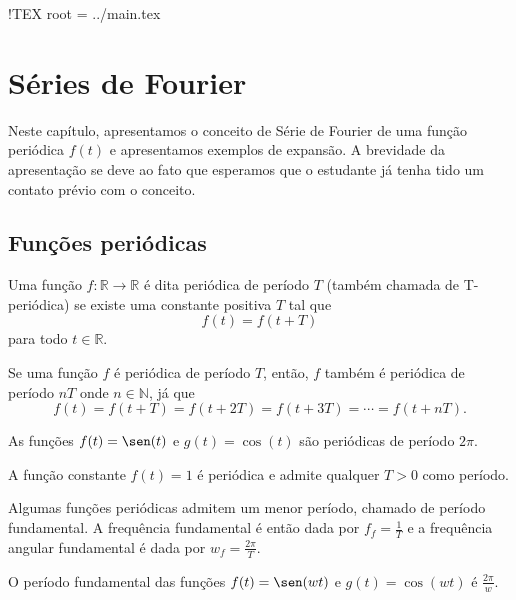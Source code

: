 !TEX root = ../main.tex
\chapter{Séries de Fourier} %
Neste capítulo, apresentamos o conceito de Série de Fourier de uma função periódica $f(t)$ e apresentamos exemplos de expansão. A brevidade da apresentação se deve ao fato que esperamos que o estudante já tenha tido um contato prévio com o conceito.
\section{Funções periódicas}
\begin{defn} Uma função $f:\mathbb{R}\to\mathbb{R}$ é dita periódica de período $T$ (também chamada de T-periódica) se existe uma constante positiva $T$ tal que
\begin{equation}f(t)=f(t+T)\end{equation}
para todo $t\in\mathbb{R}.$
\end{defn}
\begin{obs} Se uma função $f$ é periódica de período $T$, então, $f$ também é periódica de período $nT$ onde $n\in\mathbb{N}$, já que
\begin{equation}f(t)=f(t+T)=f(t+2T)=f(t+3T)=\cdots =f(t+nT).\end{equation}
 \end{obs}
 \begin{ex}
  As funções $f(t)=\sen(t)$ e $g(t)=\cos(t)$ são periódicas de período $2\pi$.
 \end{ex}
\begin{ex}
  A função constante $f(t)=1$ é periódica e admite qualquer $T>0$ como período.
 \end{ex}
\begin{defn} Algumas funções periódicas admitem um menor período, chamado de período fundamental. A frequência fundamental é então dada por $f_f=\frac{1}{T}$ e a frequência angular fundamental é dada por $w_f=\frac{2\pi}{T}$.
 \end{defn}
\begin{prop}O período fundamental das funções $f(t)=\sen(wt)$ e $g(t)=\cos(wt)$ é $\frac{2\pi}{w} $.
\end{prop}
